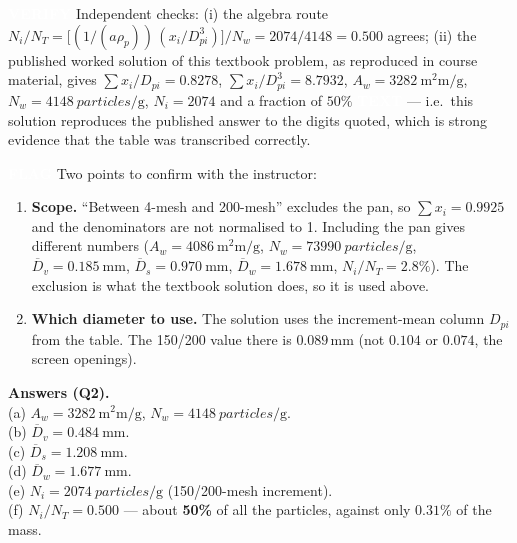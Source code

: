 \documentclass[10pt,a4paper]{article}
\newcommand{\chip}[2]{{\setlength{\fboxsep}{3pt}%
  \colorbox{#1}{\textcolor{white}{\bfseries\footnotesize #2}}}}
\newcommand{\VERIFY}{\chip{vercol}{VERIFY}}
\newcommand{\FLAGTAG}{\chip{flagcol}{FLAG}}
\newcommand{\TEXT}{\chip{txtcol}{TEXT}}
\begin{document}
\begin{verres}
\VERIFY{} Independent checks: (i) the algebra route
$N_i/N_T=\big[(1/(a\rho_p))\,(x_i/D_{pi}^3)\big]/N_w=2074/4148=0.500$ agrees;
(ii) the published worked solution of this textbook problem, as reproduced in course material,
gives $\sum x_i/D_{pi}=0.8278$, $\sum x_i/D_{pi}^3=8.7932$,
$A_w=\SI{3282}{\square\milli\meter\per\gram}$, $N_w=\SI{4148}{particles\per\gram}$,
$N_i=2074$ and a fraction of $50\%$ \TEXT{} --- i.e.\ this solution reproduces the published
answer to the digits quoted, which is strong evidence that the table was transcribed correctly.
\end{verres}

\begin{flagres}
\FLAGTAG{} Two points to confirm with the instructor:
\begin{enumerate}
  \item \textbf{Scope.} ``Between 4-mesh and 200-mesh'' excludes the pan, so $\sum x_i=0.9925$ and the
        denominators are not normalised to 1. Including the pan gives different numbers
        ($A_w=\SI{4086}{\square\milli\meter\per\gram}$, $N_w=\SI{73990}{particles\per\gram}$,
        $\overline{D}_v=\SI{0.185}{\milli\meter}$, $\overline{D}_s=\SI{0.970}{\milli\meter}$,
        $\overline{D}_w=\SI{1.678}{\milli\meter}$, $N_i/N_T=2.8\%$). The exclusion is what the
        textbook solution does, so it is used above.
  \item \textbf{Which diameter to use.} The solution uses the increment-mean column $D_{pi}$ from the
        table. The 150/200 value there is $0.089$\,mm (not $0.104$ or $0.074$, the screen openings).
\end{enumerate}
\end{flagres}

\begin{ansbox}
\textbf{Answers (Q2).}\\
(a) $A_w=\SI{3282}{\square\milli\meter\per\gram}$, \quad $N_w=\SI{4148}{particles\per\gram}$.\\
(b) $\overline{D}_v=\SI{0.484}{\milli\meter}$.\\
(c) $\overline{D}_s=\SI{1.208}{\milli\meter}$.\\
(d) $\overline{D}_w=\SI{1.677}{\milli\meter}$.\\
(e) $N_i=\SI{2074}{particles\per\gram}$ \;(150/200-mesh increment).\\
(f) $N_i/N_T=0.500$ --- about \textbf{50\%} of all the particles, against only $0.31\%$ of the mass.
\end{ansbox}
\end{document}
